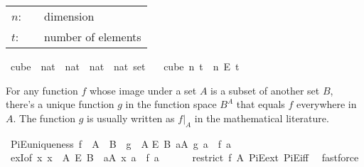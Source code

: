 \begin{isabellebody}
\begin{isamarkuptext}
\begin{tabular}{lcp{8cm}}
$n$:& \isa{nat}& dimension\\
$t$:& \isa{nat}& number of elements\\
\end{tabular}%
\end{isamarkuptext}\isamarkuptrue%
\isamarkupfalse%
\ cube\ {\isacharcolon}{\kern0pt}{\isacharcolon}{\kern0pt}\ {\isachardoublequoteopen}nat\ {\isasymRightarrow}\ nat\ {\isasymRightarrow}\ {\isacharparenleft}{\kern0pt}nat\ {\isasymRightarrow}\ nat{\isacharparenright}{\kern0pt}\ set{\isachardoublequoteclose}\isanewline
\ \ \ {\isachardoublequoteopen}cube\ n\ t\ {\isasymequiv}\ {\isacharbraceleft}{\kern0pt}{\isachardot}{\kern0pt}{\isachardot}{\kern0pt}{\isacharless}{\kern0pt}n{\isacharbraceright}{\kern0pt}\ {\isasymrightarrow}\isactrlsub E\ {\isacharbraceleft}{\kern0pt}{\isachardot}{\kern0pt}{\isachardot}{\kern0pt}{\isacharless}{\kern0pt}t{\isacharbraceright}{\kern0pt}{\isachardoublequoteclose}%
\begin{isamarkuptext}%
For any function $f$ whose image under a set $A$ is a subset of another set $B$, there's
a unique function $g$ in the function space $B^A$ that equals $f$ everywhere in $A$.
  The function $g$ is usually written as $f|_A$ in the mathematical literature.%
\end{isamarkuptext}\isamarkuptrue%
\isamarkupfalse%
\ PiE{\isacharunderscore}{\kern0pt}uniqueness{\isacharcolon}{\kern0pt}\ {\isachardoublequoteopen}f\ {\isacharbackquote}{\kern0pt}\ A\ {\isasymsubseteq}\ B\ {\isasymLongrightarrow}\ {\isasymexists}{\isacharbang}{\kern0pt}g\ {\isasymin}\ A\isanewline
{\isasymrightarrow}\isactrlsub E\ B{\isachardot}{\kern0pt}\ {\isasymforall}a{\isasymin}A{\isachardot}{\kern0pt}\ g\ a\ {\isacharequal}{\kern0pt}\ f\ a{\isachardoublequoteclose}\isanewline
%
\isadelimproof
\ \ %
\endisadelimproof
%
\isatagproof
{}\isamarkupfalse%
\ exI{\isacharbrackleft}{\kern0pt}of\ {\isachardoublequoteopen}{\isasymlambda}x{\isachardot}{\kern0pt}\ x\ {\isasymin}\ A\ {\isasymrightarrow}\isactrlsub E\ B\ {\isasymand}\ {\isacharparenleft}{\kern0pt}{\isasymforall}a{\isasymin}A{\isachardot}{\kern0pt}\ x\ a\ {\isacharequal}{\kern0pt}\ f\ a{\isacharparenright}{\kern0pt}{\isachardoublequoteclose}\isanewline
\ \ \ \ \ \ {\isachardoublequoteopen}restrict\ f\ A{\isachardoublequoteclose}{\isacharbrackright}{\kern0pt}\ PiE{\isacharunderscore}{\kern0pt}ext\ PiE{\isacharunderscore}{\kern0pt}iff\ \isamarkupfalse%
\ fastforce%
\endisatagproof

\end{isabellebody}
